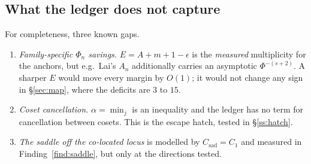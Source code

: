 \subsection{What the ledger does not capture}\label{ss:notcaptured}

For completeness, three known gaps.
\begin{enumerate}[label=\textup{(\alph*)},leftmargin=2.6em,itemsep=3pt]
\item \emph{Family-specific $\Phi_n$ savings.} $E=A+m+1-\epsilon$ is the \emph{measured}
      multiplicity for the anchors, but e.g.\ Lai's $A_n$ additionally carries an asymptotic
      $\Phi^{-(s+2)}$. A sharper $E$ would move every margin by $O(1)$; it would not change
      any sign in \S\ref{sec:map}, where the deficits are $3$ to $15$.
\item \emph{Coset cancellation.} $\alpha=\min_j$ is an inequality and the ledger has no term
      for cancellation between cosets. This is the escape hatch, tested in \S\ref{ss:hatch}.
\item \emph{The saddle off the co-located locus} is modelled by $C_{\mathrm{sad}}=C_1$ and
      measured in Finding~\ref{find:saddle}, but only at the directions tested.
\end{enumerate}
